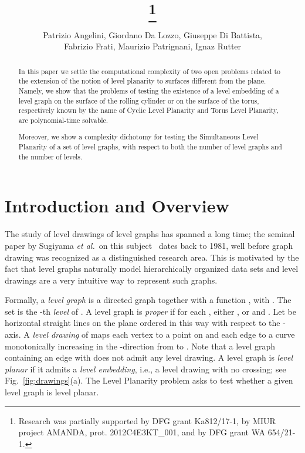 \documentclass{llncs}
\title{\try\thanks{Research was partially supported by DFG grant Ka812/17-1, by MIUR project AMANDA, prot. 2012C4E3KT\_001, and by DFG grant WA 654/21-1.}
}
\author{Patrizio {Angelini\tuba}, Giordano {Da Lozzo\rome}, Giuseppe {Di Battista\rome}, \\
    Fabrizio {Frati\rome}, Maurizio {Patrignani\rome}, Ignaz {Rutter\kit}
	\institute{
    \tuba T\"ubingen University, Germany --
    \email{angelini@informatik.uni-tuebingen.de}\\
	\rome~Roma Tre University, Italy --
    \email{\{dalozzo,gdb,frati,patrigna\}@dia.uniroma3.it}\\
    \kit~Karlsruhe Institute of Technology, Germany -- 
    \email{rutter@kit.edu}
}}
\begin{document}
\maketitle
\pagestyle{plain}

\begin{abstract}
In this paper we settle the computational complexity of two open problems related to the extension of the notion of level planarity to surfaces different from the plane. Namely, we show that the problems of testing the existence of a level embedding of a level graph on the surface of the rolling cylinder or on the surface of the torus, respectively known by the name of {\sc Cyclic Level Planarity} and {\sc Torus Level Planarity}, are polynomial-time solvable. 
 
Moreover, we show a complexity dichotomy for testing the {\sc Simultaneous Level Planarity} of a set of level graphs, with respect to both the number of level graphs and the number of levels.
\end{abstract}



\section{Introduction and Overview} \label{se:intro}


The study of level drawings of level graphs has spanned a long time; the seminal paper by Sugiyama {\em et al.}~on this subject~\cite{stt-mvuhs-81} dates back to 1981, well before graph drawing was recognized as a distinguished research area. This is motivated by the fact that level graphs naturally model hierarchically organized data sets and level drawings are a very intuitive way to represent such graphs.

Formally, a \emph{level graph}  is a directed graph  together with a function , with . The set  is the -th \emph{level} of .  
A level graph  is \emph{proper} if for each , either , or  and . Let  be  horizontal straight lines on the plane ordered in this way with respect to the -axis. A \emph{level drawing} of  maps each vertex  to a point on  and each edge  to a curve monotonically increasing in the -direction from  to . Note that a level graph  containing an edge  with  does not admit any level drawing. A level graph is \emph{level planar} if it admits a {\em level embedding}, i.e., a level drawing with no crossing; see Fig.~\ref{fig:drawings}(a). The {\sc Level Planarity} problem asks to test whether a given level graph is level planar.
 
\end{document}
